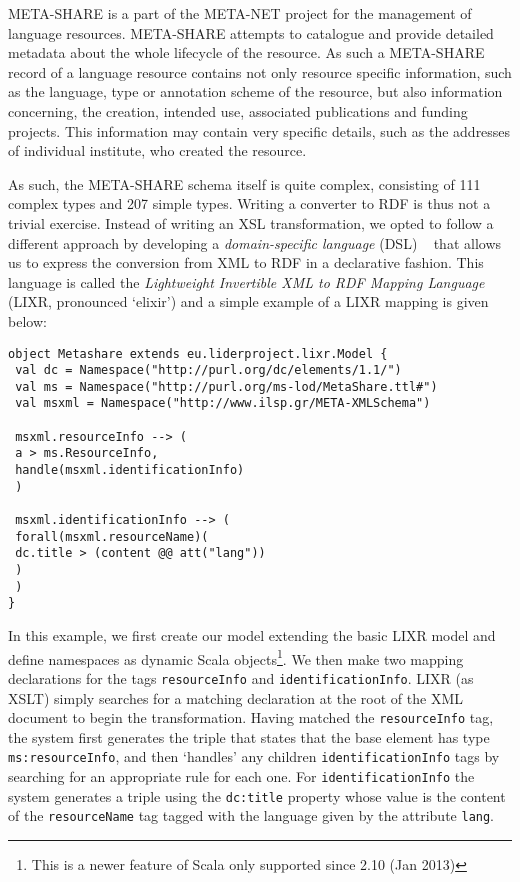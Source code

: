 \documentclass{acm_proc_article-sp}
\begin{document}
META-SHARE is a part of the META-NET project for the management of language resources. 
META-SHARE attempts to catalogue and provide detailed metadata about the whole
lifecycle of the resource. As such a META-SHARE record of a language resource
contains not only resource specific information, such as the language, type
or annotation scheme of the resource, but also information concerning, the
creation, intended use, associated publications and funding projects. This 
information may contain very specific details, such as the addresses of individual
institute, who created the resource.

As such, the META-SHARE schema itself is quite complex, consisting of 111 complex types
and 207 simple types.
Writing a\textsc{} converter to RDF is thus not a trivial exercise. Instead of writing an
XSL transformation, we opted to follow a different approach by developing a
\emph{domain-specific language} (DSL) ~\cite{fowler2010domain} that allows us to express the conversion from XML to RDF in a declarative fashion.
This language is called the \textit{Lightweight Invertible XML to RDF Mapping
Language} (LIXR, pronounced `elixir') and a simple example of a
LIXR mapping is given below:

{\scriptsize
\begin{verbatim}
object Metashare extends eu.liderproject.lixr.Model {
 val dc = Namespace("http://purl.org/dc/elements/1.1/")
 val ms = Namespace("http://purl.org/ms-lod/MetaShare.ttl#")
 val msxml = Namespace("http://www.ilsp.gr/META-XMLSchema")

 msxml.resourceInfo --> (
 a > ms.ResourceInfo,
 handle(msxml.identificationInfo)
 )

 msxml.identificationInfo --> (
 forall(msxml.resourceName)(
 dc.title > (content @@ att("lang"))
 )
 )
}
\end{verbatim}}
In this example, we first create our model extending the basic LIXR model and
define namespaces as dynamic Scala objects\footnote{This is a newer feature of
Scala only supported since 2.10 (Jan 2013)}. We then make two mapping
declarations for the tags {\tt resourceInfo} and {\tt identificationInfo}. LIXR (as
XSLT) simply searches for a matching declaration at the root of the XML document
to begin the transformation. Having matched the {\tt resourceInfo} tag, the system
first generates the triple that states that the base element has type
{\tt ms:resourceInfo}, and then `handles' any children {\tt identificationInfo} tags by
searching for an appropriate rule for each one. For {\tt identificationInfo} the
system generates a triple using the {\tt dc:title} property whose value is the
content of the {\tt resourceName} tag tagged with the language given by the
attribute {\tt lang}.
\end{document}
